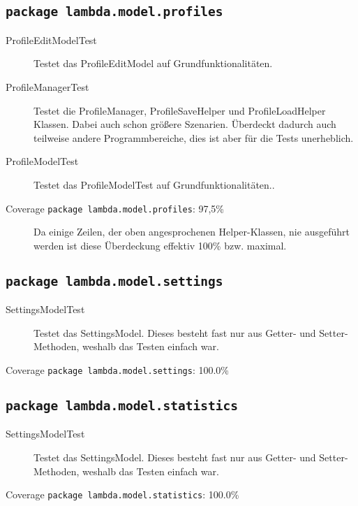 \subsection{\texttt{package lambda.model.profiles}}

\begin{description}
\item[ProfileEditModelTest] Testet das ProfileEditModel auf Grundfunktionalitäten.

\item[ProfileManagerTest] Testet die ProfileManager, ProfileSaveHelper und ProfileLoadHelper Klassen. Dabei auch schon größere Szenarien. Überdeckt dadurch auch teilweise andere Programmbereiche, dies ist aber für die Tests unerheblich.

\item[ProfileModelTest] Testet das ProfileModelTest auf Grundfunktionalitäten..

\item[Coverage \texttt{package lambda.model.profiles}: 97,5\%] Da einige Zeilen, der oben angesprochenen Helper-Klassen, nie ausgeführt werden ist diese Überdeckung effektiv 100\% bzw. maximal.
\end{description}

\subsection{\texttt{package lambda.model.settings}}
\begin{description}
\item[SettingsModelTest] Testet das SettingsModel. Dieses besteht fast nur aus Getter- und Setter- Methoden, weshalb das Testen einfach war.

\item[Coverage \texttt{package lambda.model.settings}: 100.0\%] 
\end{description}

\subsection{\texttt{package lambda.model.statistics}}
\begin{description}
\item[SettingsModelTest] Testet das SettingsModel. Dieses besteht fast nur aus Getter- und Setter- Methoden, weshalb das Testen einfach war.

\item[Coverage \texttt{package lambda.model.statistics}: 100.0\%] 
\end{description}